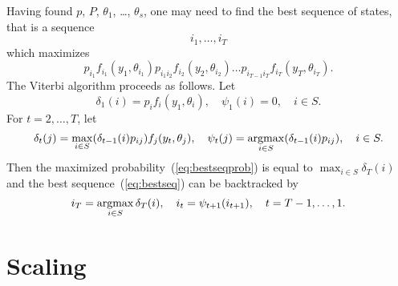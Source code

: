 Having found $p$, $P$, $\theta_1$, \ldots, $\theta_s$, one may need to
find the best sequence of states, that is a sequence
\begin{equation} \label{eq:bestseq}
  i_1, \ldots, i_T
\end{equation}
which maximizes
\begin{equation} \label{eq:bestseqprob}
  p_{i_1}f_{i_1}(y_1, \theta_{i_1}) p_{i_1i_2}f_{i_2}(y_2, \theta_{i_2})
  \ldots p_{i_{T - 1}i_T}f_{i_T}(y_T, \theta_{i_T}).
\end{equation}
The Viterbi algorithm proceeds as follows. Let
\begin{displaymath}
  \delta_1(i) = p_i f_i(y_1, \theta_i), \hspace{1em} \psi_1(i) =
  0, \hspace{1em} i \in S.
\end{displaymath}
For $t = 2, \ldots, T$, let
\begin{displaymath}
  \delta_t(j) = \max_{i \in S} (\delta_{t - 1}(i) p_{ij}) f_j(y_t,
  \theta_j),
  \hspace{1em}
  \psi_t(j) = \operatorname*{argmax}_{i \in S} (\delta_{t - 1}(i) p_{ij}),
  \hspace{1em} i \in S.
\end{displaymath}
Then the maximized probability~(\ref{eq:bestseqprob}) is equal to
$\max_{i \in S} \delta_T(i)$ and the best sequence~(\ref{eq:bestseq})
can be backtracked by
\begin{displaymath}
  i_T = \operatorname*{argmax}_{i \in S} \delta_T(i),
  \hspace{1em}
  i_t = \psi_{t + 1}(i_{t + 1}), \hspace{1em} t = T - 1, \ldots, 1.
\end{displaymath}

\section{Scaling}


